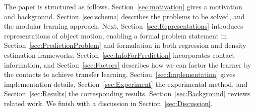 The paper is structured as follows.  Section~\ref{sec:motivation} gives a motivation and background. Section~\ref{sec:schema} describes the problems to be solved, and the modular learning approach. Next, Section~\ref{sec:Representations} introduces representations of object motion, enabling a formal problem statement in Section~\ref{sec:PredictionProblem} and formulation in both regression and density estimation frameworks. Section~\ref{sec:InfoForPrediction} incorporates contact information, and Section~\ref{sec:Factors} describes how we can factor the learner by the contacts to achieve transfer learning. Section~\ref{sec:Implementation} gives implementation details, Section~\ref{sec:Experiment} the experimental method, and Section~\ref{sec:Results} the corresponding results. Section~\ref{sec:Background} reviews related work.  We finish with a discussion in Section~\ref{sec:Discussion}.